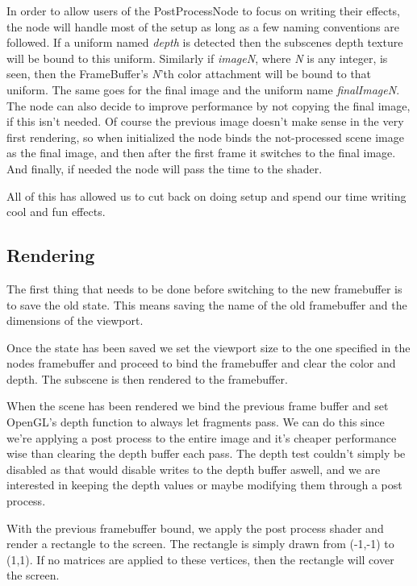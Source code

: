 In order to allow users of the PostProcessNode to focus on writing
their effects, the node will handle most of the setup as long as a few
naming conventions are followed. If a uniform named \textit{depth} is
detected then the subscenes depth texture will be bound to this
uniform. Similarly if \textit{imageN}, where \textit{N} is any
integer, is seen, then the FrameBuffer's \textit{N}'th color
attachment will be bound to that uniform. The same goes for the final
image and the uniform name \textit{finalImageN}. The node can also
decide to improve performance by not copying the final image, if this
isn't needed. Of course the previous image doesn't make sense in the
very first rendering, so when initialized the node binds the
not-processed scene image as the final image, and then after the first
frame it switches to the final image. And finally, if needed the node
will pass the time to the shader.

All of this has allowed us to cut back on doing setup and spend our
time writing cool and fun effects.

\subsection*{Rendering}


The first thing that needs to be done before switching to the new
framebuffer is to save the old state. This means saving the name of
the old framebuffer and the dimensions of the viewport.

Once the state has been saved we set the viewport size to the one
specified in the nodes framebuffer and proceed to bind the framebuffer
and clear the color and depth. The subscene is then rendered to the
framebuffer.


When the scene has been rendered we bind the previous frame buffer and
set OpenGL's depth function to always let fragments pass. We can do
this since we're applying a post process to the entire image and it's
cheaper performance wise than clearing the depth buffer each pass. The
depth test couldn't simply be disabled as that would disable writes to
the depth buffer aswell, and we are interested in keeping the depth
values or maybe modifying them through a post process.

With the previous framebuffer bound, we apply the post process shader
and render a rectangle to the screen. The rectangle is simply drawn
from (-1,-1) to (1,1). If no matrices are applied to these vertices,
then the rectangle will cover the screen.

